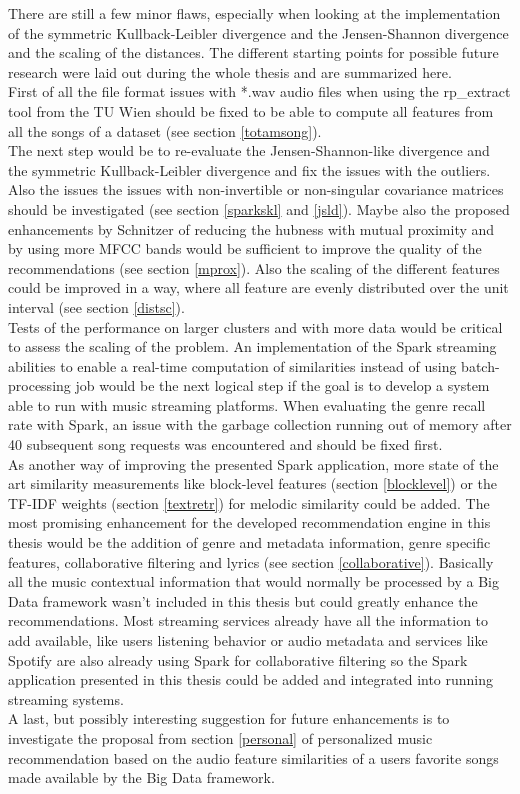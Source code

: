 There are still a few minor flaws, especially when looking at the implementation of the symmetric Kullback-Leibler divergence and the Jensen-Shannon divergence and the scaling of the distances. The different starting points for possible future research were laid out during the whole thesis and are summarized here.\\
First of all the file format issues with *.wav audio files when using the rp\_extract tool from the TU Wien should be fixed to be able to compute all features from all the songs of a dataset (see section \ref{totamsong}).\\
The next step would be to re-evaluate the Jensen-Shannon-like divergence and the symmetric Kullback-Leibler divergence and fix the issues with the outliers. Also the issues the issues with non-invertible or non-singular covariance matrices should be investigated (see section \ref{sparkskl} and \ref{jsld}). Maybe also the proposed enhancements by Schnitzer \cite{schnitzer1} of reducing the hubness with mutual proximity and by using more MFCC bands would be sufficient to improve the quality of the recommendations (see section \ref{mprox}). Also the scaling of the different features could be improved in a way, where all feature are evenly distributed over the unit interval (see section \ref{distsc}).\\
Tests of the performance on larger clusters and with more data would be critical to assess the scaling of the problem.
An implementation of the Spark streaming abilities to enable a real-time computation of similarities instead of using batch-processing job would be the next logical step if the goal is to develop a system able to run with music streaming platforms. When evaluating the genre recall rate with Spark, an issue with the garbage collection running out of memory after 40 subsequent song requests was encountered and should be fixed first.\\
\noindent As another way of improving the presented Spark application, more state of the art similarity measurements like block-level features (section \ref{blocklevel}) or the TF-IDF weights (section \ref{textretr}) for melodic similarity could be added. The most promising enhancement for the developed recommendation engine in this thesis would be the addition of genre and metadata information, genre specific features, collaborative filtering and lyrics (see section \ref{collaborative}). Basically all the music contextual information that would normally be processed by a Big Data framework wasn't included in this thesis but could greatly enhance the recommendations. Most streaming services already have all the information to add available, like users listening behavior or audio metadata and services like Spotify are also already using Spark for collaborative filtering so the Spark application presented in this thesis could be added and integrated into running streaming systems.\\
A last, but possibly interesting suggestion for future enhancements is to investigate the proposal from section \ref{personal} of personalized music recommendation based on the audio feature similarities of a users favorite songs made available by the Big Data framework.

